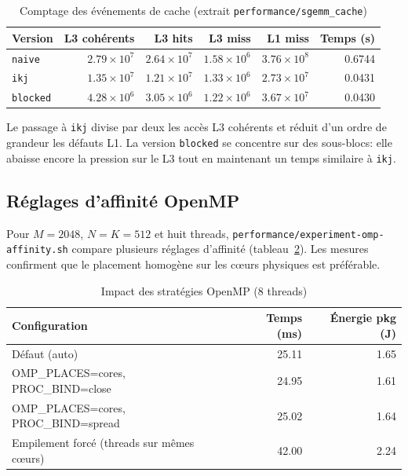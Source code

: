 \documentclass[a4paper,11pt]{article}
\begin{document}
\begin{table}[H]
\centering
\caption{Comptage des événements de cache (extrait \texttt{performance/sgemm\_cache})}
\label{tab:cache}
\begin{tabular}{lrrrrr}
\toprule
Version & L3 cohérents & L3 hits & L3 miss & L1 miss & Temps (s) \\
\midrule
\texttt{naive} & $2.79\times 10^{7}$ & $2.64\times 10^{7}$ & $1.58\times 10^{6}$ & $3.76\times 10^{8}$ & 0.6744 \\
\texttt{ikj} & $1.35\times 10^{7}$ & $1.21\times 10^{7}$ & $1.33\times 10^{6}$ & $2.73\times 10^{7}$ & 0.0431 \\
\texttt{blocked} & $4.28\times 10^{6}$ & $3.05\times 10^{6}$ & $1.22\times 10^{6}$ & $3.67\times 10^{7}$ & 0.0430 \\
\bottomrule
\end{tabular}
\end{table}

Le passage à \texttt{ikj} divise par deux les accès L3 cohérents et réduit d'un ordre de grandeur les défauts L1. La version \texttt{blocked} se concentre sur des sous-blocs: elle abaisse encore la pression sur le L3 tout en maintenant un temps similaire à \texttt{ikj}.

\subsection{Réglages d'affinité OpenMP}\label{subsec:omp-affinity}
Pour $M=2048$, $N=K=512$ et huit threads, \texttt{performance/experiment-omp-affinity.sh} compare plusieurs réglages d'affinité (tableau~\ref{tab:affinity}). Les mesures confirment que le placement homogène sur les cœurs physiques est préférable.

\begin{table}[H]
\centering
\caption{Impact des stratégies OpenMP (8 threads)}
\label{tab:affinity}
\begin{tabular}{lrr}
\toprule
Configuration & Temps (ms) & Énergie pkg (J) \\
\midrule
Défaut (auto) & 25.11 & 1.65 \\
OMP\_PLACES=cores, PROC\_BIND=close & 24.95 & 1.61 \\
OMP\_PLACES=cores, PROC\_BIND=spread & 25.02 & 1.64 \\
Empilement forcé (threads sur mêmes cœurs) & 42.00 & 2.24 \\
\bottomrule
\end{tabular}
\end{table}
\end{document}

